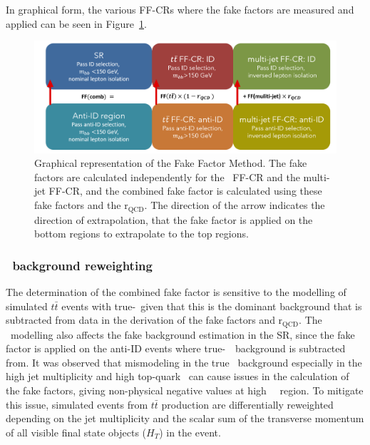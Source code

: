 In graphical form, the various FF-CRs 
where the fake factors are measured and applied can be seen in Figure~\ref{fig:CombFFMethod}.
\begin{figure}[htbp]
\centering
\includegraphics[width=.9\textwidth]{DiHiggs/plots/FF regions.png}
\caption{Graphical representation of the Fake Factor Method. 
The fake factors are calculated independently for the \ttbar\ FF-CR and the multi-jet FF-CR, and 
the combined fake factor is calculated using these fake factors and the $\mathrm{r}_{\mathrm{QCD}}$. 
The direction of the arrow indicates the direction 
of extrapolation, 
that the fake factor is applied on the bottom regions to extrapolate to the top regions.}
\label{fig:CombFFMethod}
\end{figure}



\subsubsection{\texorpdfstring{\ttbar}{ttbar}\ background reweighting}
\label{sec:ttbar-reweighting}
The determination of the combined fake factor 
is sensitive to the modelling of simulated $t\bar{t}$ events with true-\tauhad\
given that this is the dominant background that is subtracted from data in the derivation of
the fake factors and $\mathrm{r}_\text{QCD}$.
The \ttbar\ modelling also affects the fake background estimation in the SR,
since the fake factor is applied on the anti-ID events where true-\tauhad\ \ttbar\ 
background is subtracted from.
It was observed that mismodeling in the true \ttbar\ background 
especially in the high jet multiplicity and high top-quark \pt\ 
can cause issues in the calculation of the fake factors, 
giving non-physical negative values at high \tauhad\ \pt\ region. 
To mitigate this issue,
simulated events from $t\bar{t}$ production are differentially reweighted
depending on the jet multiplicity and the scalar sum of the transverse momentum of all visible
final state objects ($H_T$) in the event.

